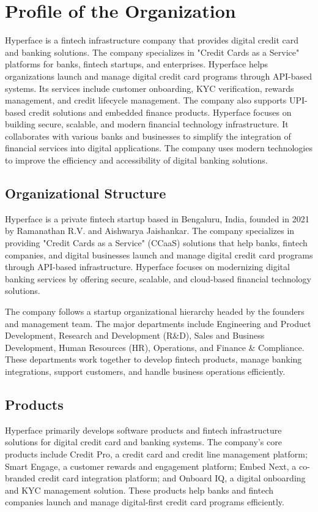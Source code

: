 \chapter{Profile of the Organization}
Hyperface  is a fintech infrastructure company that provides digital credit card and banking solutions. The company specializes in "Credit Cards as a Service" platforms for banks, fintech startups, and enterprises. Hyperface helps organizations launch and manage digital credit card programs through API-based systems. Its services include customer onboarding, KYC verification, rewards management, and credit lifecycle management. The company also supports UPI-based credit solutions and embedded finance products. Hyperface focuses on building secure, scalable, and modern financial technology infrastructure. It collaborates with various banks and businesses to simplify the integration of financial services into digital applications. The company uses modern technologies to improve the efficiency and accessibility of digital banking solutions.

\section{Organizational Structure}
Hyperface is a private fintech startup based in Bengaluru, India, founded in 2021 by Ramanathan R.V. and Aishwarya Jaishankar. The company specializes in providing "Credit Cards as a Service" (CCaaS) solutions that help banks, fintech companies, and digital businesses launch and manage digital credit card programs through API-based infrastructure. Hyperface focuses on modernizing digital banking services by offering secure, scalable, and cloud-based financial technology solutions.

The company follows a startup organizational hierarchy headed by the founders and management team. The major departments include Engineering and Product Development, Research and Development (R\&D), Sales and Business Development, Human Resources (HR), Operations, and Finance \& Compliance. These departments work together to develop fintech products, manage banking integrations, support customers, and handle business operations efficiently.

\section{Products}
Hyperface primarily develops software products and fintech infrastructure solutions for digital credit card and banking systems. The company's core products include Credit Pro, a credit card and credit line management platform; Smart Engage, a customer rewards and engagement platform; Embed Next, a co-branded credit card integration platform; and Onboard IQ, a digital onboarding and KYC management solution. These products help banks and fintech companies launch and manage digital-first credit card programs efficiently.

